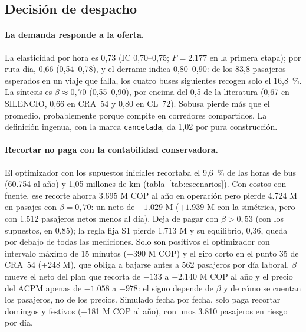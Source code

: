\subsection{Decisión de despacho}
\label{sec:res-decision}

\paragraph{La demanda responde a la oferta.} La elasticidad por hora es 0,73 (IC 0,70--0,75; $F = 2.177$ en la primera
etapa); por ruta-día, 0,66 (0,54--0,78), y el derrame indica 0,80--0,90: de los 83,8 pasajeros esperados en un viaje
que falla, los cuatro buses siguientes recogen solo el 16,8~\%. La síntesis es $\beta \approx 0{,}70$ (0,55--0,90), por
encima del 0,5 de la literatura (0,67 en SILENCIO, 0,66 en CRA~54 y 0,80 en CL~72). Sobusa pierde más que el promedio,
probablemente porque compite en corredores compartidos. La definición ingenua, con la marca \texttt{cancelada}, da 1,02
por pura construcción.

\paragraph{Recortar no paga con la contabilidad conservadora.} El optimizador con los supuestos iniciales recortaba el
9,6~\% de las horas de bus (60.754 al año) y 1,05 millones de km (tabla~\ref{tab:escenarios}). Con costos con fuente,
ese recorte ahorra 3.695 M COP al año en operación pero pierde 4.724 M en pasajes con $\beta = 0{,}70$: un neto de
$-1.029$ M ($+1.939$ M con la simétrica, pero con 1.512 pasajeros netos menos al día). Deja de pagar con
$\beta > 0{,}53$ (con los supuestos, en 0,85); la regla fija S1 pierde 1.713 M y su equilibrio, 0,36, queda por debajo
de todas las mediciones. Solo son positivos el optimizador con intervalo máximo de 15 minutos (+390 M COP) y el giro
corto en el punto 35 de CRA~54 (+248 M), que obliga a bajarse antes a 562 pasajeros por día laboral. $\beta$ mueve el
neto del plan que recorta de $-133$ a $-2.140$ M COP al año y el precio del ACPM apenas de $-1.058$ a $-978$: el signo depende de
$\beta$ y de cómo se cuentan los pasajeros, no de los precios. Simulado fecha por fecha, solo paga recortar domingos y
festivos (+181 M COP al año), con unos 3.810 pasajeros en riesgo por día.

